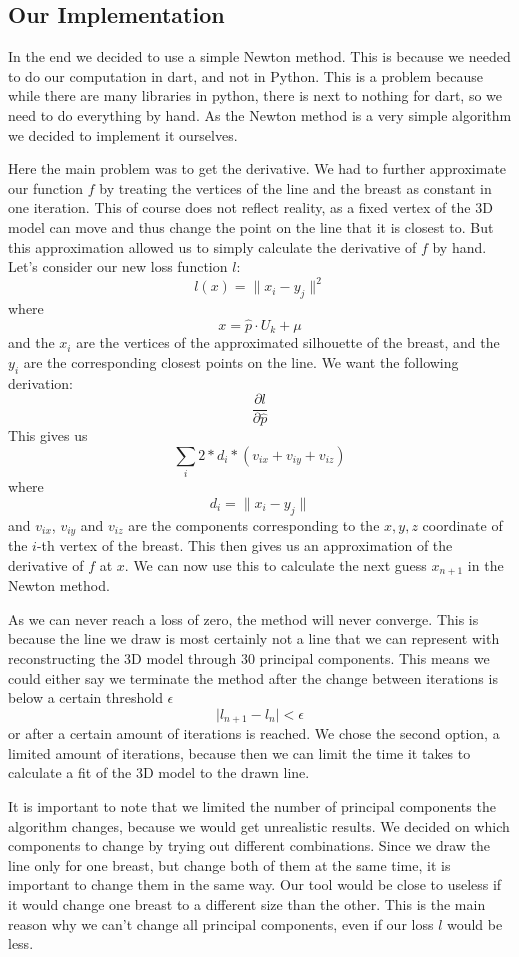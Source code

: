 \subsection{Our Implementation}\label{sec:implementation}

In the end we decided to use a simple Newton method. This is because we needed to do our computation in dart, and not in Python. This is a problem because while there are many
libraries in python, there is next to nothing for dart, so we need to do everything by hand. As the Newton method is a very simple algorithm we decided to implement it ourselves.

Here the main problem was to get the derivative. We had to further approximate our function $f$ by treating the vertices of the line and the breast as constant in one iteration. This of course does not
reflect reality, as a fixed vertex of the 3D model can move and thus change the point on the line that it is closest to. But this approximation allowed us to simply calculate the derivative of $f$ by hand.
Let's consider our new loss function $l$:
\[
    l(x) = \lVert x_i - y_j \rVert^2
\]
where 
\[
    x = \hat{p} \cdot U_k + \mu
\]
and the $x_i$ are the vertices of the approximated silhouette of the breast, and the $y_i$ are the corresponding closest points on the line. We want the following derivation:
\[
    \frac{\partial l}{\partial \hat{p}}
\]
This gives us
\[
    \sum_{i}{} 2 * d_i * (v_{ix} + v_{iy} + v_{iz})
\]
where
\[
    d_i = \lVert x_i - y_j \rVert
\]
and $v_{ix}$, $v_{iy}$ and $v_{iz}$ are the components corresponding to the $x,y,z$ coordinate of the $i$-th vertex of the breast. This then gives us an approximation of the derivative of $f$ at $x$.
We can now use this to calculate the next guess $x_{n+1}$ in the Newton method. 

As we can never reach a loss of zero, the method will never converge. This is because the line we draw is most
certainly not a line that we can represent with reconstructing the 3D model through 30 principal components. This means we could either say we terminate the method after the change between
iterations is below a certain threshold $\epsilon$
\[
    \lvert l_{n+1} - l_n \rvert < \epsilon  
\]
or after a certain amount of iterations is reached. We chose the second option, a limited amount of iterations, because then we can limit the time it takes to calculate a fit of the 3D model
to the drawn line. 

It is important to note that we limited the number of principal components the algorithm changes, because we would get unrealistic results. We decided on which components to 
change by trying out different combinations. Since we draw the line only for one breast, but change both of them at the same time, it is important to change them in the same way. Our tool would be close to useless
if it would change one breast to a different size than the other. This is the main reason why we can't change all principal components, even if our loss $l$ would be less. 

